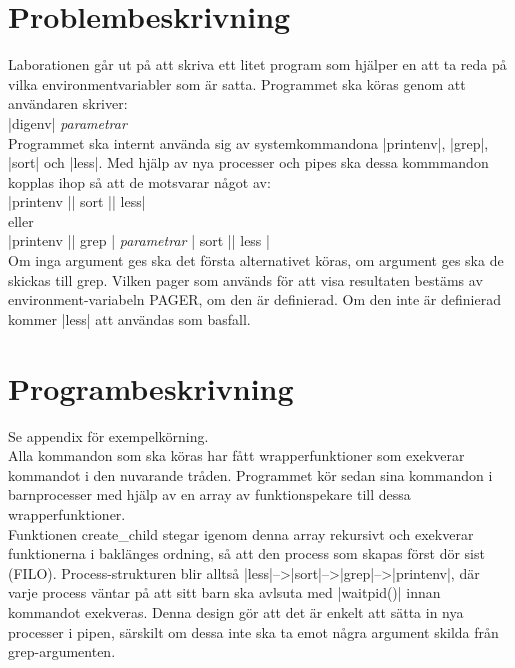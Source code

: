 \documentclass[paper=a4, fontsize=11pt]{scrartcl} %
\numberwithin{equation}{section} %
\numberwithin{figure}{section} %
\numberwithin{table}{section} %
\begin{document}
\section{Problembeskrivning}
Laborationen går ut på att skriva ett litet program som hjälper en att ta reda
på vilka environmentvariabler som är satta.
Programmet ska köras genom att användaren skriver:
\\
|digenv| \emph{parametrar}
\\
Programmet ska internt använda sig av systemkommandona |printenv|, |grep|,
|sort| och |less|.
Med hjälp av nya processer och pipes ska dessa kommmandon kopplas ihop
så att de motsvarar något av:
\\
|printenv |\textbar| sort |\textbar| less| \\ eller \\
|printenv |\textbar| grep | \emph{parametrar} \textbar | sort |\textbar| less |
\\
Om inga argument ges ska det första alternativet köras, om argument ges ska
de skickas till grep.
Vilken pager som används för att visa resultaten bestäms av
environment-variabeln PAGER, om den är definierad.
Om den inte är definierad kommer |less| att användas som basfall.


\section{Programbeskrivning}

Se appendix för exempelkörning.\\


Alla kommandon som ska köras har fått wrapperfunktioner som exekverar kommandot
i den nuvarande tråden.
Programmet kör sedan sina kommandon i barnprocesser med hjälp av en array av
funktionspekare till dessa wrapperfunktioner.
\\

Funktionen create\_child stegar igenom denna array rekursivt och exekverar
funktionerna i baklänges ordning, så att den process som skapas först dör sist
(FILO). Process-strukturen blir alltså |less|-->|sort|-->|grep|-->|printenv|,
där varje process väntar på att sitt barn ska avlsuta med |waitpid()| innan
kommandot exekveras. Denna design gör att det är enkelt att sätta in nya
processer i pipen, särskilt om dessa inte ska ta emot några argument skilda
från grep-argumenten.
\\ %
\end{document}
